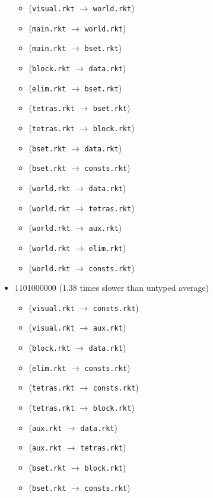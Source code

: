 \documentclass{article}
\newcommand{\mono}[1]{\texttt{#1}}
\begin{document}
\begin{itemize}
  \begin{itemize}
  \item (\mono{visual.rkt} $\rightarrow$ \mono{world.rkt})
  \item (\mono{main.rkt} $\rightarrow$ \mono{world.rkt})
  \item (\mono{main.rkt} $\rightarrow$ \mono{bset.rkt})
  \item (\mono{block.rkt} $\rightarrow$ \mono{data.rkt})
  \item (\mono{elim.rkt} $\rightarrow$ \mono{bset.rkt})
  \item (\mono{tetras.rkt} $\rightarrow$ \mono{bset.rkt})
  \item (\mono{tetras.rkt} $\rightarrow$ \mono{block.rkt})
  \item (\mono{bset.rkt} $\rightarrow$ \mono{data.rkt})
  \item (\mono{bset.rkt} $\rightarrow$ \mono{consts.rkt})
  \item (\mono{world.rkt} $\rightarrow$ \mono{data.rkt})
  \item (\mono{world.rkt} $\rightarrow$ \mono{tetras.rkt})
  \item (\mono{world.rkt} $\rightarrow$ \mono{aux.rkt})
  \item (\mono{world.rkt} $\rightarrow$ \mono{elim.rkt})
  \item (\mono{world.rkt} $\rightarrow$ \mono{consts.rkt})
  \end{itemize}
\item 1101000000 (1.38 times slower than untyped average)
  \begin{itemize}
  \item (\mono{visual.rkt} $\rightarrow$ \mono{consts.rkt})
  \item (\mono{visual.rkt} $\rightarrow$ \mono{aux.rkt})
  \item (\mono{block.rkt} $\rightarrow$ \mono{data.rkt})
  \item (\mono{elim.rkt} $\rightarrow$ \mono{consts.rkt})
  \item (\mono{tetras.rkt} $\rightarrow$ \mono{consts.rkt})
  \item (\mono{tetras.rkt} $\rightarrow$ \mono{block.rkt})
  \item (\mono{aux.rkt} $\rightarrow$ \mono{data.rkt})
  \item (\mono{aux.rkt} $\rightarrow$ \mono{tetras.rkt})
  \item (\mono{bset.rkt} $\rightarrow$ \mono{block.rkt})
  \item (\mono{bset.rkt} $\rightarrow$ \mono{consts.rkt})

\end{itemize}
\end{itemize}
\end{document}
